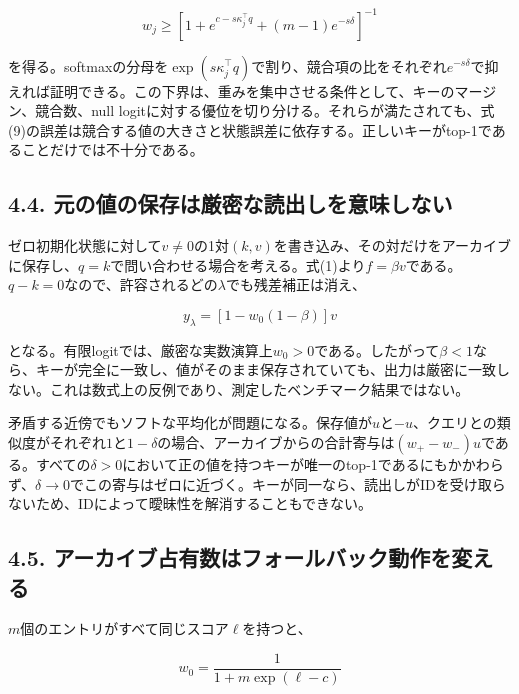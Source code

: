 \documentclass[11pt,a4paper]{article}
\begin{document}
\nopagebreak[4]

\[
w_j\geq\left[1+e^{c-s\kappa_j^{\top}q}
 +(m-1)e^{-s\delta}\right]^{-1}
\tag{10}
\]

を得る。softmaxの分母を\(\exp(s\kappa_j^{\top}q)\)で割り、競合項の比をそれぞれ\(e^{-s\delta}\)で抑えれば証明できる。この下界は、重みを集中させる条件として、キーのマージン、競合数、null logitに対する優位を切り分ける。それらが満たされても、式(9)の誤差は競合する値の大きさと状態誤差に依存する。正しいキーがtop-1であることだけでは不十分である。

\subsection{4.4. 元の値の保存は厳密な読出しを意味しない}\label{ux5143ux306eux5024ux306eux4fddux5b58ux306fux53b3ux5bc6ux306aux8aadux51faux3057ux3092ux610fux5473ux3057ux306aux3044}

ゼロ初期化状態に対して\(v\ne0\)の1対\((k,v)\)を書き込み、その対だけをアーカイブに保存し、\(q=k\)で問い合わせる場合を考える。式(1)より\(f=\beta v\)である。\(q-k=0\)なので、許容されるどの\(\lambda\)でも残差補正は消え、

\nopagebreak[4]

\[
y_{\lambda}=[1-w_0(1-\beta)]v
\tag{11}
\]

となる。有限logitでは、厳密な実数演算上\(w_0>0\)である。したがって\(\beta<1\)なら、キーが完全に一致し、値がそのまま保存されていても、出力は厳密に一致しない。これは数式上の反例であり、測定したベンチマーク結果ではない。

矛盾する近傍でもソフトな平均化が問題になる。保存値が\(u\)と\(-u\)、クエリとの類似度がそれぞれ\(1\)と\(1-\delta\)の場合、アーカイブからの合計寄与は\((w_+-w_-)u\)である。すべての\(\delta>0\)において正の値を持つキーが唯一のtop-1であるにもかかわらず、\(\delta\to0\)でこの寄与はゼロに近づく。キーが同一なら、読出しがIDを受け取らないため、IDによって曖昧性を解消することもできない。

\subsection{4.5. アーカイブ占有数はフォールバック動作を変える}\label{ux30a2ux30fcux30abux30a4ux30d6ux5360ux6709ux6570ux306fux30d5ux30a9ux30fcux30ebux30d0ux30c3ux30afux52d5ux4f5cux3092ux5909ux3048ux308b}

\(m\)個のエントリがすべて同じスコア\(\ell\)を持つと、

\nopagebreak[4]

\[
w_0=\frac{1}{1+m\exp(\ell-c)}
\tag{12}
\]
\end{document}
